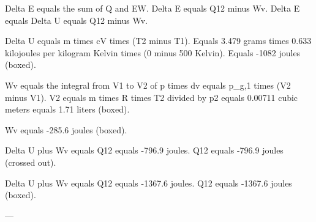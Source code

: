 Delta E equals the sum of Q and EW.  
Delta E equals Q12 minus Wv.  
Delta E equals Delta U equals Q12 minus Wv.  

Delta U equals m times cV times (T2 minus T1).  
Equals 3.479 grams times 0.633 kilojoules per kilogram Kelvin times (0 minus 500 Kelvin).  
Equals -1082 joules (boxed).  

Wv equals the integral from V1 to V2 of p times dv equals p_g,1 times (V2 minus V1).  
V2 equals m times R times T2 divided by p2 equals 0.00711 cubic meters equals 1.71 liters (boxed).  

Wv equals -285.6 joules (boxed).  

Delta U plus Wv equals Q12 equals -796.9 joules.  
Q12 equals -796.9 joules (crossed out).  

Delta U plus Wv equals Q12 equals -1367.6 joules.  
Q12 equals -1367.6 joules (boxed).  

---